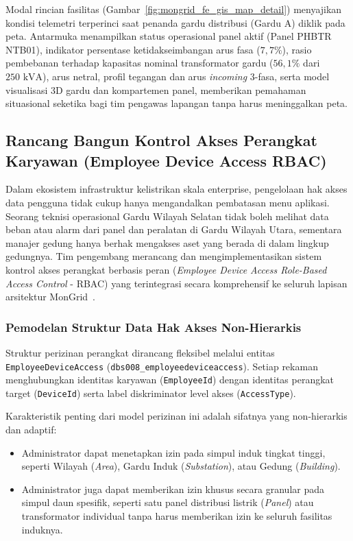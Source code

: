 Modal rincian fasilitas (Gambar~\ref{fig:mongrid_fe_gis_map_detail}) menyajikan kondisi telemetri terperinci saat penanda gardu distribusi (Gardu A) diklik pada peta. Antarmuka menampilkan status operasional panel aktif (Panel PHBTR NTB01), indikator persentase ketidakseimbangan arus fasa ($7{,}7\%$), rasio pembebanan terhadap kapasitas nominal transformator gardu ($56{,}1\%$ dari $250\text{ kVA}$), arus netral, profil tegangan dan arus \textit{incoming} 3-fasa, serta model visualisasi 3D gardu dan kompartemen panel, memberikan pemahaman situasional seketika bagi tim pengawas lapangan tanpa harus meninggalkan peta.

\subsection{Rancang Bangun Kontrol Akses Perangkat Karyawan (Employee Device Access RBAC)}

Dalam ekosistem infrastruktur kelistrikan skala enterprise, pengelolaan hak akses data pengguna tidak cukup hanya mengandalkan pembatasan menu aplikasi. Seorang teknisi operasional Gardu Wilayah Selatan tidak boleh melihat data beban atau alarm dari panel dan peralatan di Gardu Wilayah Utara, sementara manajer gedung hanya berhak mengakses aset yang berada di dalam lingkup gedungnya. Tim pengembang merancang dan mengimplementasikan sistem kontrol akses perangkat berbasis peran (\textit{Employee Device Access Role-Based Access Control} - RBAC) yang terintegrasi secara komprehensif ke seluruh lapisan arsitektur MonGrid~\cite{ferraiolo2001rbac, rfc7519_jwt}.

\subsubsection{Pemodelan Struktur Data Hak Akses Non-Hierarkis}

Struktur perizinan perangkat dirancang fleksibel melalui entitas \texttt{EmployeeDeviceAccess} (\texttt{dbs008\_employeedeviceaccess}). Setiap rekaman menghubungkan identitas karyawan (\texttt{EmployeeId}) dengan identitas perangkat target (\texttt{DeviceId}) serta label diskriminator level akses (\texttt{AccessType}).

Karakteristik penting dari model perizinan ini adalah sifatnya yang non-hierarkis dan adaptif:
\begin{itemize}[leftmargin=*, itemsep=0pt]
  \item Administrator dapat menetapkan izin pada simpul induk tingkat tinggi, seperti Wilayah (\textit{Area}), Gardu Induk (\textit{Substation}), atau Gedung (\textit{Building}).
  \item Administrator juga dapat memberikan izin khusus secara granular pada simpul daun spesifik, seperti satu panel distribusi listrik (\textit{Panel}) atau transformator individual tanpa harus memberikan izin ke seluruh fasilitas induknya.
\end{itemize}

